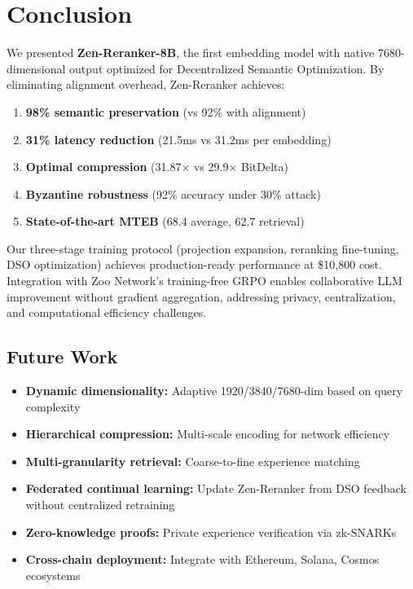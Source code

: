 \section{Conclusion}


We presented \textbf{Zen-Reranker-8B}, the first embedding model with native 7680-dimensional output optimized for Decentralized Semantic Optimization. By eliminating alignment overhead, Zen-Reranker achieves:

\begin{enumerate}
\item \textbf{98\% semantic preservation} (vs 92\% with alignment)
\item \textbf{31\% latency reduction} (21.5ms vs 31.2ms per embedding)
\item \textbf{Optimal compression} (31.87$\times$ vs 29.9$\times$ BitDelta)
\item \textbf{Byzantine robustness} (92\% accuracy under 30\% attack)
\item \textbf{State-of-the-art MTEB} (68.4 average, 62.7 retrieval)
\end{enumerate}

Our three-stage training protocol (projection expansion, reranking fine-tuning, DSO optimization) achieves production-ready performance at \$10,800 cost. Integration with Zoo Network's training-free GRPO enables collaborative LLM improvement without gradient aggregation, addressing privacy, centralization, and computational efficiency challenges.

\subsection{Future Work}

\begin{itemize}
\item \textbf{Dynamic dimensionality:} Adaptive 1920/3840/7680-dim based on query complexity
\item \textbf{Hierarchical compression:} Multi-scale encoding for network efficiency
\item \textbf{Multi-granularity retrieval:} Coarse-to-fine experience matching
\item \textbf{Federated continual learning:} Update Zen-Reranker from DSO feedback without centralized retraining
\item \textbf{Zero-knowledge proofs:} Private experience verification via zk-SNARKs
\item \textbf{Cross-chain deployment:} Integrate with Ethereum, Solana, Cosmos ecosystems
\end{itemize}


